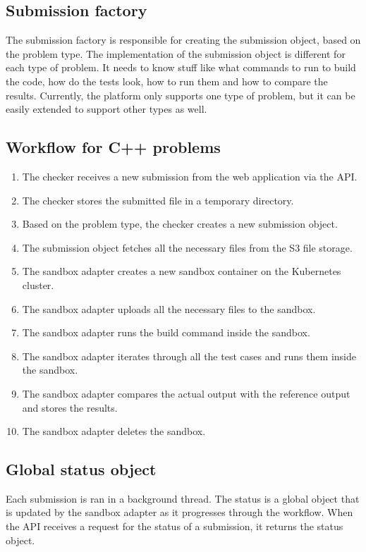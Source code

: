\documentclass[12pt,a4paper]{report}
\begin{document}
\subsection{Submission factory}
The submission factory is responsible for creating the submission object, based on the problem type. The implementation of the submission object is different for each type of problem. It needs to know stuff like what commands to run to build the code, how do the tests look, how to run them and how to compare the results. Currently, the platform only supports one type of problem, but it can be easily extended to support other types as well.

\subsection{Workflow for C++ problems}
\begin{enumerate}
	\item The checker receives a new submission from the web application via the API.
	\item The checker stores the submitted file in a temporary directory.
	\item Based on the problem type, the checker creates a new submission object.
	\item The submission object fetches all the necessary files from the S3 file storage.
	\item The sandbox adapter creates a new sandbox container on the Kubernetes cluster.
	\item The sandbox adapter uploads all the necessary files to the sandbox.
	\item The sandbox adapter runs the build command inside the sandbox.
	\item The sandbox adapter iterates through all the test cases and runs them inside the sandbox.
	\item The sandbox adapter compares the actual output with the reference output and stores the results.
	\item The sandbox adapter deletes the sandbox.
\end{enumerate}


\subsection{Global status object}
Each submission is ran in a background thread. The status is a global object that is updated by the sandbox adapter as it progresses through the workflow. When the API receives a request for the status of a submission, it returns the status object.
\end{document}
